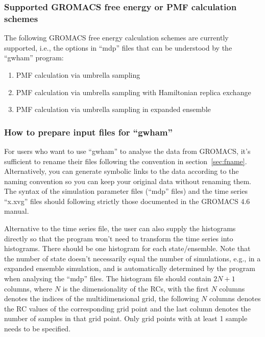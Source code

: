 \subsubsection{Supported GROMACS free energy or PMF calculation schemes}
The following GROMACS free energy calculation schemes are currently supported, i.e., 
the options in ``mdp'' files that can be understood by the ``gwham'' program:

\begin{enumerate}
  \item \label{it:umb} PMF calculation via umbrella sampling 
  \item \label{it:hrex} PMF calculation via umbrella sampling with Hamiltonian replica exchange 
  \item \label{it:expens} PMF calculation via umbrella sampling in expanded ensemble 
\end{enumerate}


\subsubsection{How to prepare input files for ``gwham''}\label{sec:fformat}
For users who want to use ``gwham'' to analyse the data from GROMACS, it's
sufficient to rename their files following the convention in
section~\ref{sec:fname}. Alternatively,  you can generate symbolic links to the
data according to the naming convention so you can keep your original data
without renaming them. The syntax of the simulation parameter files (``mdp''
files) and the time series ``x.xvg'' files should following strictly those
documented in the GROMACS 4.6 manual. 

Alternative to the time series file, the user can also supply the histograms
directly so that the program won't need to transform the time series into
histograms. There should be one histogram for each state/ensemble. Note that
the number of state doesn't necessarily equal the number of simulations, e.g.,
in a expanded ensemble simulation, and is automatically determined by the
program when analysing the ``mdp'' files.  The histogram file should contain
$2N+1$ columns, where $N$ is the dimensionality of the RCs, with the first $N$
columns denotes the indices of the multidimensional grid, the following $N$
columns denotes the RC values of the corresponding grid point and the last
column denotes the number of samples in that grid point. Only grid points with 
at least 1 sample needs to be specified.


